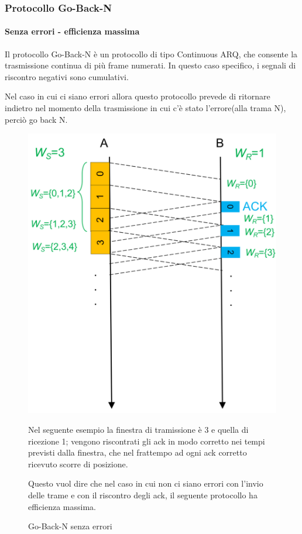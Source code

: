 \subsubsection{Protocollo Go-Back-N}
\paragraph{Senza errori - efficienza massima}
Il protocollo Go-Back-N è un protocollo di tipo Continuous ARQ, che consente la trasmissione continua di più frame numerati. In questo caso specifico, i segnali di riscontro negativi sono cumulativi.

Nel caso in cui ci siano errori allora questo protocollo prevede di ritornare indietro nel momento della trasmissione in cui c'è stato l'errore(alla trama N), perciò go back N.
\begin{figure}[htbp]
    \centering
    \begin{minipage}{0.4\textwidth}
        \includegraphics[width=\linewidth]{images/gobackinsenzaerrori.png}
        \caption{Go-Back-N senza errori}
    \end{minipage}%
    \hfill
    \begin{minipage}{0.55\textwidth}
        Nel seguente esempio la finestra di tramissione è 3 e quella di ricezione 1; vengono riscontrati gli ack in modo corretto nei tempi previsti dalla finestra, che nel frattempo ad ogni ack corretto ricevuto scorre di posizione.
        
        Questo vuol dire che nel caso in cui non ci siano errori con l'invio delle trame e con il riscontro degli ack, il seguente protocollo ha efficienza massima.
 
    \end{minipage}
\end{figure}
 \newpage
